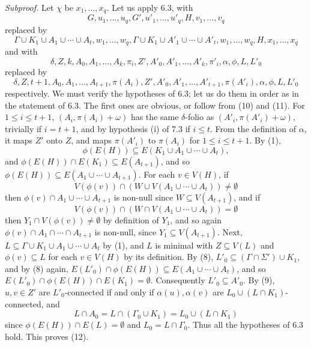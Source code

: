 \textit{Subproof.} Let $\chi$ be $x_1, \ldots, x_q$. Let us apply 6.3, with
\begin{equation*}
G, u_1, \ldots, u_q, G', u'_1, \ldots, u'_q, H, v_1, \ldots, v_q
\end{equation*}
replaced by
\begin{equation*}
\Gamma \cup K_1 \cup A_1 \cup \cdots \cup A_t, w_1, \ldots, w_q, \Gamma \cup K_1 \cup A'_1 \cup \cdots \cup A'_t, w_1, \ldots, w_q, H, x_1, \ldots, x_q
\end{equation*}
and with
\begin{equation*}
\delta, Z, k, A_0, A_1, \ldots, A_k, \pi_i, Z', A'_0, A'_1, \ldots, A'_k, \pi'_i, \alpha, \phi, L, L'_0
\end{equation*}
replaced by
\begin{equation*}
\delta, Z, t+1, A_0, A_1, \ldots, A_{t+1}, \pi(A_i), Z', A'_0, A'_1, \ldots, A'_{t+1}, \pi(A'_i), \alpha, \phi, L, L'_0
\end{equation*}
respectively. We must verify the hypotheses of 6.3; let us do them in order as in the statement of 6.3. The first ones are obvious, or follow from (10) and (11). For $1 \le i \le t+1$, $(A_i, \pi(A_i) + \omega)$ has the same $\delta$-folio as $(A'_i, \pi(A'_i) + \omega)$, trivially if $i = t+1$, and by hypothesis (i) of 7.3 if $i \le t$. From the definition of $\alpha$, it maps $Z'$ onto $Z$, and maps $\pi(A'_i)$ to $\pi(A_i)$ for $1 \le i \le t+1$. By (1),
\begin{equation*}
\phi(E(H)) \subseteq E(K_1 \cup A_1 \cup \cdots \cup A_t),
\end{equation*}
and $\phi(E(H)) \cap E(K_1) \subseteq E(A_{t+1})$, and so $\phi(E(H)) \subseteq E(A_1 \cup \cdots \cup A_{t+1})$. For each $v \in V(H)$, if
\begin{equation*}
V(\phi(v)) \cap (W \cup V(A_1 \cup \cdots \cup A_t)) \ne \emptyset
\end{equation*}
then $\phi(v) \cap A_1 \cup \cdots \cup A_{t+1}$ is non-null since $W \subseteq V(A_{t+1})$, and if
\begin{equation*}
V(\phi(v)) \cap (W \cap V(A_1 \cup \cdots \cup A_t)) = \emptyset
\end{equation*}
then $Y_1 \cap V(\phi(v)) \ne \emptyset$ by definition of $Y_1$, and so again $\phi(v) \cap A_1 \cap \cdots \cap A_{t+1}$ is non-null, since $Y_1 \subseteq V(A_{t+1})$. Next, $L \subseteq \Gamma \cup K_1 \cup A_1 \cup \cdots \cup A_t$ by (1), and $L$ is minimal with $Z \subseteq V(L)$ and $\phi(v) \subseteq L$ for each $v \in V(H)$ by its definition. By (8), $L'_0 \subseteq (\Gamma \cap \Sigma') \cup K_1$, and by (8) again, $E(L'_0) \cap \phi(E(H)) \subseteq E(A_1 \cup \cdots \cup A_t)$, and so $E(L'_0) \cap \phi(E(H)) \cap E(K_1) = \emptyset$. Consequently $L'_0 \subseteq A'_0$. By (9), $u, v \in Z'$ are $L'_0$-connected if and only if $\alpha(u), \alpha(v)$ are $L_0 \cup (L \cap K_1)$-connected, and
\begin{equation*}
L \cap A_0 = L \cap (\Gamma_0 \cup K_1) = L_0 \cup (L \cap K_1)
\end{equation*}
since $\phi(E(H)) \cap E(L) = \emptyset$ and $L_0 = L \cap \Gamma_0$. Thus all the hypotheses of 6.3 hold. This proves (12).
